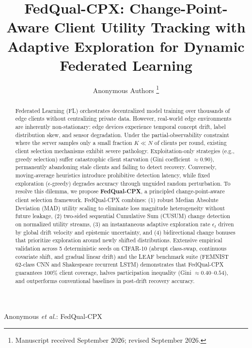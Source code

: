 \documentclass[journal,compsoc]{IEEEtran}
\begin{document}
\title{FedQual-CPX: Change-Point-Aware Client Utility Tracking with Adaptive Exploration for Dynamic Federated Learning}

\author{Anonymous Authors
\thanks{Manuscript received September 2026; revised September 2026.}}

%
{Anonymous \MakeLowercase{\textit{et al.}}: FedQual-CPX}

\maketitle

\begin{abstract}
Federated Learning (FL) orchestrates decentralized model training over thousands of edge clients without centralizing private data. However, real-world edge environments are inherently non-stationary: edge devices experience temporal concept drift, label distribution skew, and sensor degradation. Under the partial-observability constraint where the server samples only a small fraction $K \ll N$ of clients per round, existing client selection mechanisms exhibit severe pathology. Exploitation-only strategies (e.g., greedy selection) suffer catastrophic client starvation (Gini coefficient $\approx 0.90$), permanently abandoning stale clients and failing to detect recovery. Conversely, moving-average heuristics introduce prohibitive detection latency, while fixed exploration ($\epsilon$-greedy) degrades accuracy through unguided random perturbation. To resolve this dilemma, we propose \textbf{FedQual-CPX}, a principled change-point-aware client selection framework. FedQual-CPX combines: (1) robust Median Absolute Deviation (MAD) utility scaling to eliminate loss magnitude heterogeneity without future leakage, (2) two-sided sequential Cumulative Sum (CUSUM) change detection on normalized utility streams, (3) an instantaneous adaptive exploration rate $\epsilon_t$ driven by global drift velocity and epistemic uncertainty, and (4) bidirectional change bonuses that prioritize exploration around newly shifted distributions. Extensive empirical validation across 5 deterministic seeds on CIFAR-10 (abrupt class-swap, continuous covariate shift, and gradual linear drift) and the LEAF benchmark suite (FEMNIST 62-class CNN and Shakespeare recurrent LSTM) demonstrates that FedQual-CPX guarantees 100\% client coverage, halves participation inequality (Gini $\approx 0.40$--$0.54$), and outperforms conventional baselines in post-drift recovery accuracy.
\end{abstract}
\end{document}

